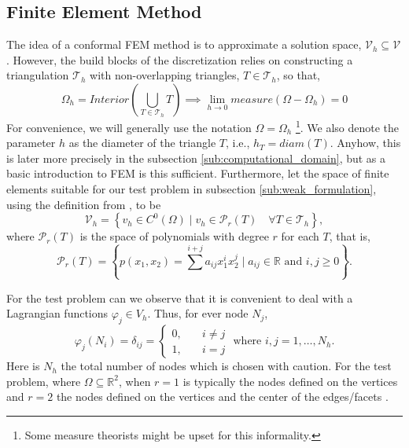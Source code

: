 \subsection{Finite Element Method}%
\label{sub:finite_element_method}
The idea of a conformal FEM method is to approximate a solution space, $\mathcal{V}_h \subseteq \mathcal{V}  $. However, the build blocks of the discretization relies on constructing a triangulation $\mathcal{T } _h$ with non-overlapping triangles, $T \in
\mathcal{T}_{h} $, so that, \[
\Omega _{h} = Interior(\bigcup_{T \in  \mathcal{T} _{h}}^{} T) \implies \lim_{h\to 0} measure(\Omega - \Omega _{h}) = 0
\]
For convenience, we will generally use the notation $\Omega  = \Omega  _{h}$ \footnote{Some measure theorists  might be upset for this informality.}. We also denote the parameter $h$ as the diameter of the triangle $T$, i.e., $h_{T} = diam(T)$. Anyhow, this is later more precisely in the subsection
\ref{sub:computational_domain}, but as a basic introduction to FEM is this sufficient.
Furthermore, let the space of finite elements suitable for our test problem in subsection \ref{sub:weak_formulation}, using the definition from \cite{quartdiff}, to be
\[
\mathcal{V} _{h} = \left\{ v_{h} \in C^{0}\left( \Omega  \right)  \mid  v_{h} \in \mathcal{P} _{r}\left( T \right)  \quad \forall T \in \mathcal{T} _{h}  \right\},
\]
where $\mathcal{P } _{r}\left( T \right) $ is the space of polynomials with degree $r$ for each $T$, that is,
\[
\mathcal{P} _{r}\left( T \right)  = \left\{ p\left( x_{1}, x_{2} \right) = \sum_{}^{i + j}  a_{ij} x^{i}_{1} x^{j}_{2}  \mid  a_{ij} \in \mathbb{R}  \text{ and } i,j \ge  0   \right\}.
\]

For the test problem can we observe that it is convenient to deal with a Lagrangian functions $\varphi _{j} \in V_{h}$. Thus, for ever node $N_{j}$, \[
\varphi _{j}\left( N_{i} \right)  = \delta _{ij} = \begin{cases}
    0, \quad & i \neq j \\
    1,\quad & i=j
\end{cases}
\text{ where } i,j = 1,\ldots, N_{h}.
\]
Here is $N_{h}$  the total number of nodes which is chosen with caution. For the test problem, where $\Omega \subseteq \mathbb{R} ^{2} $, when $r=1$ is typically the nodes defined on the vertices and $ r=2 $ the nodes defined on the vertices and the center of the edges/facets \cite{quartdiff}.

